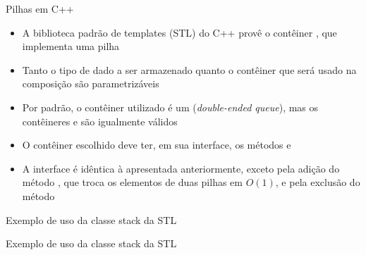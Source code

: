 \begin{frame}[fragile]{Pilhas em C++}

    \begin{itemize}
        \item A biblioteca padrão de templates (STL) do C++ provê o contêiner ,
            que implementa uma pilha

        \item Tanto o tipo de dado a ser armazenado quanto o contêiner que será usado na composição
            são parametrizáveis

        \item Por padrão, o contêiner utilizado é um  (\textit{double-ended queue}),
            mas os contêineres  e  são igualmente válidos

        \item O contêiner escolhido deve ter, em sua interface, os métodos 
            e 

        \item A interface é idêntica à apresentada anteriormente, exceto pela adição do método
            , que troca os elementos de duas pilhas em $O(1)$, e pela exclusão
            do método 

    \end{itemize}

\end{frame}

\begin{frame}[fragile]{Exemplo de uso da classe stack da STL}
\end{frame}

\begin{frame}[fragile]{Exemplo de uso da classe stack da STL}
\end{frame}
